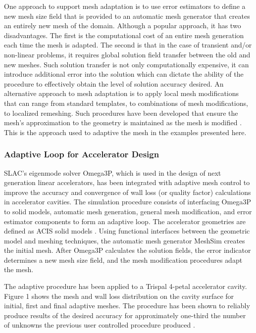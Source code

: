 One approach to support mesh adaptation is to use error estimators
to define a new mesh size field that is provided to an
automatic mesh generator that creates an entirely new mesh
of the domain. Although a popular approach, it has two
disadvantages. The first is the computational cost of an entire mesh
generation each time the mesh is adapted. The second is that in the
case of transient and/or non-linear problems, it requires global
solution field transfer between the old and new meshes. Such solution
transfer is not only computationally expensive, it can introduce
additional error into the solution which can dictate the ability of
the procedure to effectively obtain the level of solution accuracy
desired. An alternative approach to mesh adaptation is to apply local
mesh modifications \cite{LiSh05} that can range from standard templates, to
combinations of mesh modifications, to localized remeshing. Such
procedures have been developed that ensure the mesh's approximation to
the geometry is maintained as the mesh is modified \cite{LiSh03}. This is the
approach used to adaptive the mesh in the examples presented here.

\subsubsection{Adaptive Loop for Accelerator Design }

SLAC's eigenmode solver Omega3P, which is used in the design of next
generation linear accelerators, has been integrated with adaptive mesh
control \cite{GeLe04} to improve the accuracy and convergence of wall
loss (or quality factor) calculations in accelerator cavities. The
simulation procedure consists of interfacing Omega3P to solid models,
automatic mesh generation, general mesh modification, and error
estimator components to form an adaptive loop. The accelerator
geometries are defined as ACIS solid models \cite{spatial}. Using
functional interfaces between the geometric model and meshing
techniques, the automatic mesh generator MeshSim \cite{simmetrix}
creates the initial mesh. After Omega3P calculates the solution
fields, the error indicator determines a new mesh size field, and the
mesh modification procedures \cite{LiSh05} adapt the mesh.

The adaptive procedure has been applied to a Trispal 4-petal
accelerator cavity. Figure 1 shows the mesh and wall loss distribution
on the cavity surface for initial, first and final adaptive
meshes. The procedure has been shown to reliably produce results of
the desired accuracy for approximately one-third the number of
unknowns the previous user controlled procedure produced \cite{GeLe04}.



